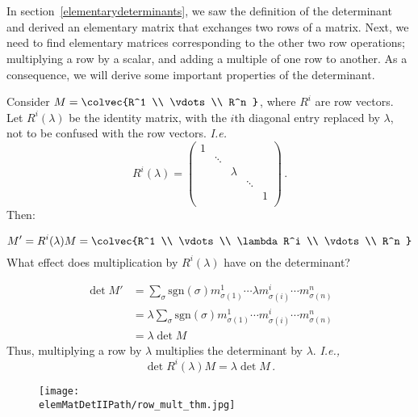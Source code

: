 
\chapter{\elemMatDetIITitle}\label{elementarydeterminantsII}

In section~\ref{elementarydeterminants}, we saw the definition of the determinant and derived an elementary matrix that exchanges two rows of a matrix.  Next, we need to find elementary matrices corresponding to the other two row operations; multiplying a row by a scalar, and adding a multiple of one row to another.  As a consequence, we will derive some important properties of the determinant.

Consider $M=\colvec{R^1 \\ \vdots \\ R^n }$, where $R^i$ are row vectors.  Let $R^i(\lambda)$ be the identity matrix, with the $i$th diagonal entry replaced by $\lambda$, not to be confused with the row vectors. {\itshape I.e.}
\[
R^i(\lambda)=
\begin{pmatrix}
1 & & & & \\
  & \ddots & & & \\
  & & \lambda & & \\
  & & & \ddots & \\
  & & & & 1 \\
\end{pmatrix}
\, .\]
Then:

\[
M'=R^i(\lambda)M=\colvec{R^1 \\ \vdots \\ \lambda R^i \\ \vdots \\ R^n }
\]
What effect does multiplication by $R^i(\lambda)$ have on the determinant?

\begin{align*}
\det M' & = \sum_{\sigma} \text{sgn}(\sigma) m^1_{\sigma(1)}\cdots \lambda m^i_{\sigma(i)} \cdots m^n_{\sigma(n)} \\
& = \lambda \sum_{\sigma} \text{sgn}(\sigma) m^1_{\sigma(1)}\cdots m^i_{\sigma(i)} \cdots m^n_{\sigma(n)} \\
& = \lambda \det M
\end{align*}
Thus, multiplying a row by $\lambda$ multiplies the determinant by $\lambda$.
{\itshape I.e.,} \[\det R^i(\lambda) M = \lambda \det M\, .\]


\begin{figure}
\begin{center}
\texttt{[image: \\elemMatDetIIPath/row\_mult\_thm.jpg]}
\end{center}
\end{figure}



